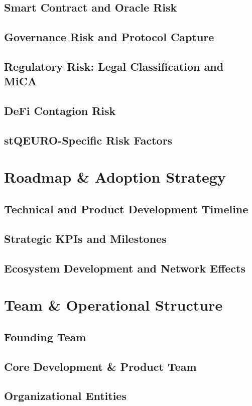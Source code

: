 \documentclass[12pt,a4paper]{report}
\begin{document}
\section{Smart Contract and Oracle Risk}
\section{Governance Risk and Protocol Capture}
\section{Regulatory Risk: Legal Classification and MiCA}
\section{DeFi Contagion Risk}
\section{stQEURO-Specific Risk Factors}

\chapter{Roadmap \& Adoption Strategy}
\section{Technical and Product Development Timeline}
\section{Strategic KPIs and Milestones}
\section{Ecosystem Development and Network Effects}

\chapter{Team \& Operational Structure}
\section{Founding Team}
\section{Core Development \& Product Team}
\section{Organizational Entities}
\end{document}
